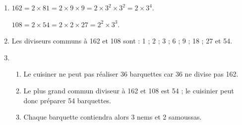 
\medskip

\begin{enumerate}
\item %
$162 = 2 \times 81 = 2 \times 9 \times 9 = 2 \times 3^2 \times 3^2 = 2 \times 3^4$.

$108 = 2 \times 54 = 2 \times 2 \times 27 = 2^2 \times 3^3$.
\item %
Les diviseurs communs à 162 et 108 sont : 1 ; 2 ; 3 ;  6 ; 9 ; 18 ; 27 et 54.
\item %


%
%
	\begin{enumerate}
		\item %
Le cuisiner ne peut pas  réaliser $36$ barquettes car 36 ne divise pas 162.
		\item %
		Le plus grand commun diviseur à 162 et 108 est 54 ; le cuisinier peut donc préparer 54 barquettes. 
		\item %
Chaque barquette contiendra alors  3 nems et 2 samoussas.
	\end{enumerate}
\end{enumerate}

\vspace{0,5cm}

